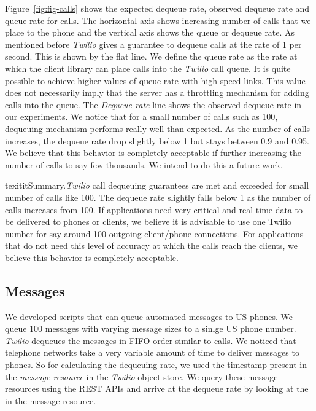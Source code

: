 Figure~\ref{fig:fig-calls} shows the expected dequeue rate, observed dequeue rate and queue rate for calls. The horizontal axis shows increasing number of calls that we place to the phone and the vertical axis shows the queue or dequeue rate. As mentioned before \textit{Twilio} gives a guarantee to dequeue calls at the rate of 1 per second. This is shown by the flat line. We define the queue rate as the rate at which the client library can place calls into the \textit{Twilio} call queue. It is quite possible to achieve higher values of queue rate with high speed links. This value does not necessarily imply that the  server has a throttling mechanism for adding calls into the queue. The \textit{Dequeue rate} line shows the observed dequeue rate in our experiments. We notice that for a small number of calls such as 100,  dequeuing mechanism performs really well than expected. As the number of calls increases, the dequeue rate drop slightly below 1 but stays between 0.9 and 0.95. We believe that this behavior is completely acceptable if further increasing the number of calls to say few thousands. We intend to do this a future work. 

{texitit}Summary.\textit{Twilio} call dequeuing guarantees are met and exceeded for small number of calls like 100. The dequeue rate slightly falls below 1 as the number of calls increases from 100. If applications need very critical and real time data to be delivered to phones or clients, we believe it is advisable to use one Twilio number for say around 100 outgoing client/phone connections. For applications that do not need this level of accuracy at which the calls reach the clients, we believe this behavior is completely acceptable. 

\subsection{Messages}
\label{sec-measurements-sms}
We developed scripts that can queue automated messages to US phones. We queue 100 messages with varying message sizes to a sinlge US phone number. \textit{Twilio} dequeues the messages in FIFO order similar to calls. We noticed that telephone networks take a very variable amount of time to deliver messages to phones. So for calculating the dequeuing rate, we used the timestamp present in the \textit{message resource} in the \textit{Twilio} object store. We query these message resources using the REST APIs and arrive at the dequeue rate by looking at the  in the message resource.   

